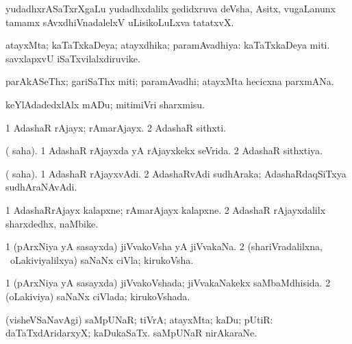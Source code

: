 \bentry 
{}
\gl{\nA}
\expl{\Latin }
\bmng
yudadhxrASaTxrXgaLu yudadhxdalilx gedidxruva deVsha, Asitx, \mo vugaLanunx tamamx sAvxdhiVnadalelxV uLisikoLuLxva tatatxvX. 
\emng
\eentry

\bentry
{} 
\gl{\gu}
\expl{}
\bmng
atayxMta; kaTaTxkaDeya; atayxdhika; paramAvadhiya:  kaTaTxkaDeya miti.  savxlapxvU iSaTxvilalxdiruvike. 
\emng
\eentry

\bentry
{} 
\gl{\nA}
\expl{}
\bmng
parAkASeThx; gariSaThx miti; paramAvadhi; atayxMta hecicxna parxmANa. 
\emng

\noindent 
\gl{\pagu}
\expl{}
\bmng
{} keYlAdadedxlAlx mADu; mitimiVri sharxmisu. 
\emng
\eentry

\bentry
{} 
\gl{\nA}
\bmng
\bnum
\num{1} AdashaR rAjayx; rAmarAjayx. 
\num{2} AdashaR sithxti. 
\enum
\emng
\eentry

\bentry
{} 
\gl{\gu}
\expl{}
\bmng
( saha). 
\bnum
\num{1} AdashaR rAjayxda yA rAjayxkekx seVrida. 
\num{2} AdashaR sithxtiya. 
\enum
\emng
\eentry

\bentry
{} 
\gl{\nA}
\expl{}
\bmng
( saha).
\bnum
\num{1} AdashaR rAjayxvAdi. 
\num{2} AdashaRvAdi sudhAraka; AdashaRdaqSiTxya sudhAraNAvAdi. 
\enum
\emng
\eentry

\bentry
{} 
\gl{\nA}
\expl{}
\bmng
\bnum
\num{1} AdashaRrAjayx kalapxne; rAmarAjayx kalapxne. 
\num{2} AdashaR rAjayxdalilx sharxdedhx, naMbike. 
\enum
\emng
\eentry

\bentry 
{} 
\gl{\nA}
\bmng
\bnum
\num{1} (pArxNiya yA sasayxda) jiVvakoVsha yA jiVvakaNa. 
\num{2} (shariVradalilxna, \kanmu\ oLakiviyalilxya) saNaNx ciVla; kirukoVsha. 
\enum
\emng
\eentry

\bentry
{} 
\gl{\gu}
\expl{}
\bmng
\bnum
\num{1} (pArxNiya yA sasayxda) jiVvakoVshada; jiVvakaNakekx saMbaMdhisida. 
\num{2} (oLakiviya) saNaNx ciVlada; kirukoVshada. 
\enum
\emng
\eentry

\bentry
{} 
\gl{\gu}
\expl{}
\bmng
(visheVSaNavAgi) saMpUNaR; tiVrA; atayxMta; kaDu; pUtiR:  daTaTxdAridarxyX; kaDukaSaTx.  saMpUNaR nirAkaraNe. 
\emng
\eentry

